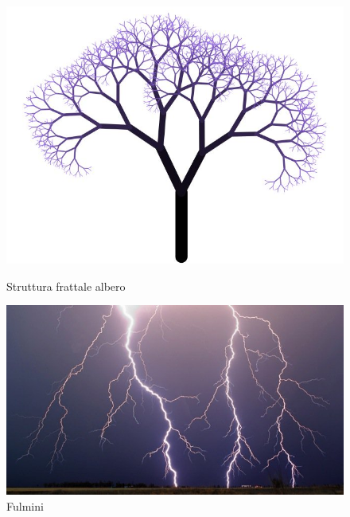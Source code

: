 \documentclass[10pt]{report}
\begin{document}
			\begin{figure}[H]
				\centering
				\includegraphics[width=0.7\linewidth]{"Frattali in natura/albero-frattale"}
				\caption*{Struttura frattale albero}
				\label{fig:albero}
				\endminipage \hfill
				\centering
				\includegraphics[width=0.7\linewidth]{"Frattali in natura/intense-fulminazioni"}
				\caption*{Fulmini}
				\label{fig:fulmine}
				\endminipage \hfill
			\end{figure}
\end{document}
